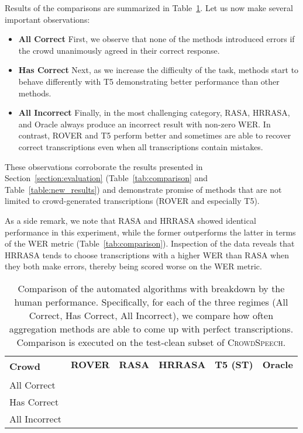 \documentclass{article}
\newcommand{\speech}{\textsc{CrowdSpeech}}
\begin{document}
Results of the comparisons are summarized in Table~\ref{tab:errors}. Let us now make several important observations:
\begin{itemize}[itemsep=0pt, leftmargin=15pt, topsep=0pt]
    \item  \textbf{All Correct} First, we observe that none of the methods introduced errors if the crowd unanimously agreed in their correct response. 
    
    \item  \textbf{Has Correct} Next, as we increase the difficulty of the task, methods start to behave differently with T5 demonstrating better performance than other methods.
    
    \item \textbf{All Incorrect} Finally, in the most challenging category, RASA, HRRASA, and Oracle always produce an incorrect result with non-zero WER. In contrast, ROVER and T5 perform better and sometimes are able to recover correct transcriptions even when all transcriptions contain mistakes.
\end{itemize}

These observations corroborate the results presented in Section~\ref{section:evaluation} (Table~\ref{tab:comparison} and Table~\ref{table:new_results}) and demonstrate promise of methods that are not limited to crowd-generated transcriptions (ROVER and especially T5). 

As a side remark, we note that RASA and HRRASA showed identical performance in this experiment, while the former outperforms the latter in terms of the WER metric (Table~\ref{tab:comparison}). Inspection of the data reveals that HRRASA tends to choose transcriptions with a higher WER than RASA when they both make errors, thereby being scored worse on the WER metric.


\begin{table}[t]
\centering
\caption{\label{tab:errors} Comparison of the automated algorithms with breakdown by the human performance. Specifically, for each of the three regimes (All Correct, Has Correct, All Incorrect), we compare how often aggregation methods are able to come up with perfect transcriptions. Comparison is executed on the test-clean subset of \speech{}.}
\begin{tabular}{l*{10}{r}}\toprule
\multirow{2}{*}{\textbf{Crowd}} & \multicolumn{2}{c}{\textbf{ROVER}} & \multicolumn{2}{c}{\textbf{RASA}} & \multicolumn{2}{c}{\textbf{HRRASA}} & \multicolumn{2}{c}{\textbf{T5 (ST)}} & \multicolumn{2}{c}{\textbf{Oracle}} \\
&  &  &  &  &  &  &  &  &  &  \\\cmidrule{2-11}
All Correct &  &  &  &  &  &  &  &  &  &  \\
Has Correct &  &  &  &  &  &  &  &  &  &  \\
All Incorrect &  &  &  &  &  &  &  &  &  &  \\\bottomrule 
\end{tabular}
\end{table}
\end{document}
